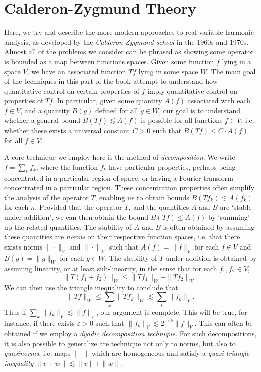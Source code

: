 
\part{Calderon-Zygmund Theory}

Here, we try and describe the more modern approaches to real-variable harmonic analysis, as developed by the \emph{Calderon-Zygmund school} in the 1960s and 1970s. Almost all of the problems we consider can be phrased as showing some operator is bounded as a map between functions spaces. Given some function $f$ lying in a space $V$, we have an associated function $Tf$ lying in some space $W$. The main goal of the techniques in this part of the book attempt to understand how quantitative control on certain properties of $f$ imply quantitative control on properties of $Tf$. In particular, given some quantity $A(f)$ associated with each $f \in V$, and a quantity $B(g)$ defined for all $g \in W$, our goal is to understand whether a general bound $B(Tf) \lesssim A(f)$ is possible for all functions $f \in V$, i.e. whether these exists a universal constant $C > 0$ such that $B(Tf) \leq C \cdot A(f)$ for all $f \in V$.

A core technique we employ here is the method of \emph{decomposition}. We write $f = \sum_k f_k$, where the function $f_k$ have particular properties, perhaps being concentrated in a particular region of space, or having a Fourier transform concentrated in a particular region. These concentration properties often simplify the analysis of the operator $T$, enabling us to obtain bounds $B(Tf_k) \lesssim A(f_k)$ for each $n$. Provided that the operator $T$, and the quantities $A$ and $B$ are `stable under addition', we can then obtain the bound $B(Tf) \leq A(f)$ by `summing' up the related quantities. The stability of $A$ and $B$ is often obtained by assuming these quantities are \emph{norms} on their respective function spaces, i.e. that there exists norms $\| \cdot \|_V$ and $\| \cdot \|_W$ such that $A(f) = \| f \|_V$ for each $f \in V$ and $B(g) = \| g \|_W$ for each $g \in W$. The stability of $T$ under addition is obtained by assuming linearity, or at least sub-linearity, in the sense that for each $f_1, f_2 \in V$,
%
\[ \| T(f_1 + f_2) \|_W \leq \| T f_1 \|_W + \| Tf_2 \|_W. \]
%
We can then use the triangle inequality to conclude that
%
\[ \| Tf \|_W \leq \sum_k \| Tf_k \|_W \lesssim \sum_k \| f_k \|_V. \]
%
Thus if $\sum_k \| f_k \|_V \lesssim \| f \|_V$, our argument is complete. This will be true, for instance, if there exists $\varepsilon > 0$ such that $\| f_k \|_V \lesssim 2^{- \varepsilon k} \| f \|_V$. This can often be obtained if we employ a \emph{dyadic decomposition technique}. For such decompositions, it is also possible to generalize are technique not only to norms, but also to \emph{quasinorms}, i.e. maps $\| \cdot \|$ which are homogeneous and satisfy a \emph{quasi-triangle inequality} $\| v + w \| \lesssim \| v \| + \| w \|$.

